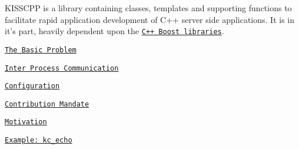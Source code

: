 K\-I\-S\-S\-C\-P\-P is a library containing classes, templates and supporting functions to facilitate rapid application development of C++ server side applications. It is in it's part, heavily dependent upon the \href{http://boost.org}{\tt C++ Boost libraries}.


\begin{DoxyItemize}
\item \href{md_the_basic_problem.html}{\tt The Basic Problem}
\item \href{md_inter_process_communication.html}{\tt Inter Process Communication}
\item \href{md_configuration.html}{\tt Configuration}
\item \href{md_mandate.html}{\tt Contribution Mandate}
\item \href{md_motivation.html}{\tt Motivation}
\item \href{md_example_echo.html}{\tt Example\-: kc\-\_\-echo} 
\end{DoxyItemize}